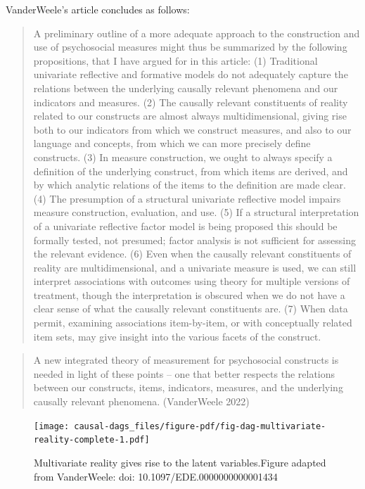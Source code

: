 \documentclass[
  singlecolumn]{report}
\begin{document}
VanderWeele's article concludes as follows:

\begin{quote}
A preliminary outline of a more adequate approach to the construction
and use of psychosocial measures might thus be summarized by the
following propositions, that I have argued for in this article: (1)
Traditional univariate reflective and formative models do not adequately
capture the relations between the underlying causally relevant phenomena
and our indicators and measures. (2) The causally relevant constituents
of reality related to our constructs are almost always multidimensional,
giving rise both to our indicators from which we construct measures, and
also to our language and concepts, from which we can more precisely
define constructs. (3) In measure construction, we ought to always
specify a definition of the underlying construct, from which items are
derived, and by which analytic relations of the items to the definition
are made clear. (4) The presumption of a structural univariate
reflective model impairs measure construction, evaluation, and use. (5)
If a structural interpretation of a univariate reflective factor model
is being proposed this should be formally tested, not presumed; factor
analysis is not sufficient for assessing the relevant evidence. (6) Even
when the causally relevant constituents of reality are multidimensional,
and a univariate measure is used, we can still interpret associations
with outcomes using theory for multiple versions of treatment, though
the interpretation is obscured when we do not have a clear sense of what
the causally relevant constituents are. (7) When data permit, examining
associations item-by-item, or with conceptually related item sets, may
give insight into the various facets of the construct.
\end{quote}

\begin{quote}
A new integrated theory of measurement for psychosocial constructs is
needed in light of these points -- one that better respects the
relations between our constructs, items, indicators, measures, and the
underlying causally relevant phenomena. (VanderWeele 2022)
\end{quote}

\begin{figure}

{\centering \texttt{[image: causal-dags\_files/figure-pdf/fig-dag-multivariate-reality-complete-1.pdf]}

}

\caption{\label{fig-dag-multivariate-reality-complete}Multivariate
reality gives rise to the latent variables.Figure adapted from
VanderWeele: doi: 10.1097/EDE.0000000000001434}

\end{figure}
\end{document}
